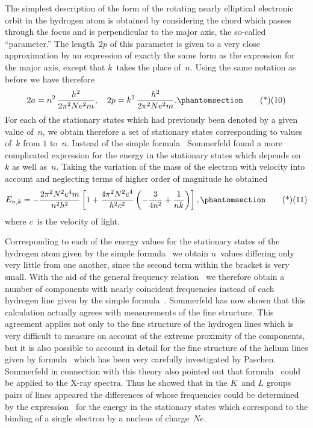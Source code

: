 The simplest description of the form of the rotating nearly
elliptical electronic orbit in the hydrogen atom is obtained by
considering the chord which passes through the focus and is
perpendicular to the major axis, the so-called ``parameter.'' The
length~$2p$ of this parameter is given to a very close approximation
by an expression of exactly the same form as the expression for the
major axis, except that $k$~takes the place of~$n$. Using the same
notation as before we have therefore
\[
2a = n^{2}\, \frac{h^{2}}{2\pi^{2} N e^{2} m},\quad
2p = k^{2}\, \frac{h^{2}}{2\pi^{2} N e^{2} m}.
\Tag{(10)}
\]
For each of the stationary states which had previously been denoted
by a given value of~$n$, we obtain therefore a set of stationary states
corresponding to values of~$k$ from $1$ to~$n$. Instead of the simple
formula~ Sommerfeld found a more complicated expression for
the energy in the stationary states which depends on~$k$ as well as~$n$.
Taking the variation of the mass of the electron with velocity
into account and neglecting terms of higher order of magnitude he
obtained
\[
E_{n,k} = -\frac{2\pi^{2} N^{2} e^{4} m}{n^{2} h^{2}}
  \left[1 + \frac{4\pi^{2} N^{2} e^{4}}{h^{2} c^{2}}\left(-\frac{3}{4n^{2}} + \frac{1}{nk}\right)\right],
\Tag{(11)}
\]
where $c$~is the velocity of light.

Corresponding to each of the energy values for the stationary
states of the hydrogen atom given by the simple formula~ we
obtain $n$~values differing only very little from one another, since
the second term within the bracket is very small. With the aid of
the general frequency relation~ we therefore obtain a number of
components with nearly coincident frequencies instead of each
hydrogen line given by the simple formula~. Sommerfeld has
now shown that this calculation actually agrees with measurements
of the fine structure. This agreement applies not only to the fine
structure of the hydrogen lines which is very difficult to measure
on account of the extreme proximity of the components, but it is
also possible to account in detail for the fine structure of the helium
lines given by formula~ which has been very carefully investigated
by Paschen. Sommerfeld in connection with this theory
also pointed out that formula~ could be applied to the X-ray
spectra. Thus he showed that in the $K$~and $L$ groups pairs of lines
appeared the differences of whose frequencies could be determined
by the expression~ for the energy in the stationary states which
correspond to the binding of a single electron by a nucleus of
charge~$Ne$.

